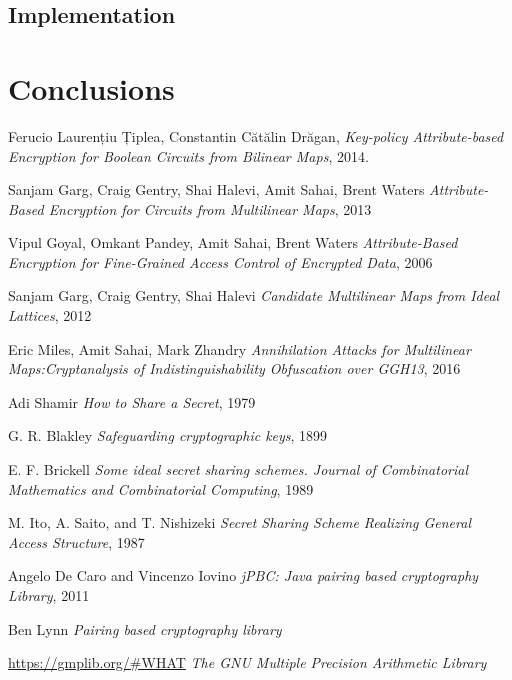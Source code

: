\documentclass[12pt]{article}
\newcommand\blankpage{%
    \null
    \thispagestyle{empty}%
    \addtocounter{page}{-1}%
    \newpage}
\begin{document}
\subsection{Implementation}

\section{Conclusions}

\pagebreak

\blankpage

\begin{thebibliography}{9}

Ferucio Laurențiu Țiplea, Constantin Cătălin Drăgan, 
\textit{Key-policy Attribute-based Encryption for Boolean Circuits from Bilinear Maps}, 2014.

Sanjam Garg, Craig Gentry, Shai Halevi, Amit Sahai, Brent Waters 
\textit{Attribute-Based Encryption for Circuits from Multilinear Maps}, 2013
 
Vipul Goyal, Omkant Pandey, Amit Sahai, Brent Waters 
\textit{Attribute-Based Encryption for Fine-Grained Access Control of Encrypted Data}, 2006

Sanjam Garg, Craig Gentry, Shai Halevi
\textit{Candidate Multilinear Maps from Ideal Lattices}, 2012

Eric Miles, Amit Sahai, Mark Zhandry
\textit{Annihilation Attacks for Multilinear Maps:Cryptanalysis of Indistinguishability Obfuscation over GGH13}, 2016

Adi Shamir
\textit{How to Share a Secret}, 1979

G. R. Blakley
\textit{Safeguarding cryptographic keys}, 1899

E. F. Brickell
\textit{Some ideal secret sharing schemes. Journal of Combinatorial Mathematics and Combinatorial Computing}, 1989

M. Ito, A. Saito, and T. Nishizeki
\textit{Secret Sharing Scheme Realizing General Access Structure}, 1987

Angelo {De Caro} and Vincenzo Iovino
\textit{jPBC: Java pairing based cryptography Library}, 2011

Ben Lynn
\textit{Pairing based cryptography library}

\href{https://gmplib.org/\#WHAT}{https://gmplib.org/\#WHAT}
\textit{The GNU Multiple Precision Arithmetic Library}


\end{thebibliography}
\end{document}
